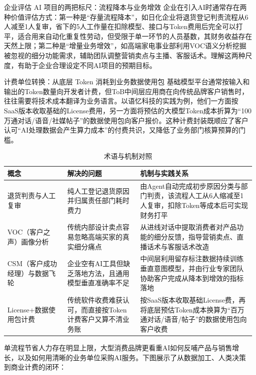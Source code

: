 \documentclass[UTF8,a4paper,11pt,fontset=fandol]{ctexart}
\begin{document}
\begin{importantbox}{企业评估 AI 项目的两把标尺：流程降本与业务增效}
企业在引入AI时通常存在两种价值评估方式：第一种是“存量流程降本”，如日化企业将退货登记判责流程从6人减至1人复审，省下的5人工作量在扣除模型、接口与Token费用后完全可以打平，适合用来自动化重复性劳动，但受限于单一环节的人员基数，其财务收益存在天然上限；第二种是“增量业务增效”，如高端家电事业部利用VOC语义分析挖掘被忽视的细分功能需求，辅助团队调整营销卖点与主播、客服话术。理解这两种尺度，有助于企业合理设定不同AI项目的预期目标。
\end{importantbox}
\begin{warningbox}{计费单位转换：从底层 Token 消耗到业务数据使用包}
基础模型平台通常按输入和输出的Token数量向开发者计费，但ToB中间层应用商在向传统品牌客户销售时，往往需要将技术成本翻译为业务语言。以语忆科技的实践为例，他们一方面按SaaS版本收取基础的License费用，另一方面将预估的大模型Token成本折算为“100万通对话/语音/社媒帖子”的数据使用包向客户报价。这种计费封装既顺应了客户认可“AI处理数据会产生算力成本”的付费共识，又降低了业务部门核算预算的门槛。
\end{warningbox}
\begin{table}[H]\centering\small
\caption{术语与机制对照}
\begin{tabular}{>{\raggedright\arraybackslash}p{\dimexpr(\linewidth-6\tabcolsep)/3\relax}>{\raggedright\arraybackslash}p{\dimexpr(\linewidth-6\tabcolsep)/3\relax}>{\raggedright\arraybackslash}p{\dimexpr(\linewidth-6\tabcolsep)/3\relax}}
\toprule
概念 & 解决的问题 & 机制与实践关系\\\midrule
退货判责与人工复审 & 纯人工登记退货原因并归属责任部门耗时费力 & 由Agent自动完成初步原因分类与部门判责，该流程人工从6人缩减至1人复审，扣除Token等成本后可实现财务打平\\[4pt]
VOC（客户之声）画像分析 & 传统内部设计卖点容易忽略高端买家的真实细分痛点 & 从进线对话中提取消费者对产品功能的细分反馈，指导营销卖点、直播话术与客服话术改造\\[4pt]
CSM（客户成功经理）与数据飞轮 & 企业空有AI工具但缺乏落地方法，且通用模型垂直准确率不足 & 中间层利用留存标注数据持续训练垂直意图模型，并由行业专家团队协助客户完成从降本到增效的指标落地\\[4pt]
License+数据使用包计费 & 传统软件收费难获认可，而直接按Token计费客户又算不清业务账 & 按SaaS版本收取基础License费，再将底层预估Token成本换算为“百万通对话/语音/帖子”的数据使用包向客户收费\\[4pt]
\bottomrule\end{tabular}\end{table}
单流程节省人力存在明显上限，大型消费品牌更看重AI如何反哺产品与销售增长，以及如何用清晰的业务单位采购AI服务。下图展示了从数据加工、人类决策到商业计费的闭环：
\end{document}
